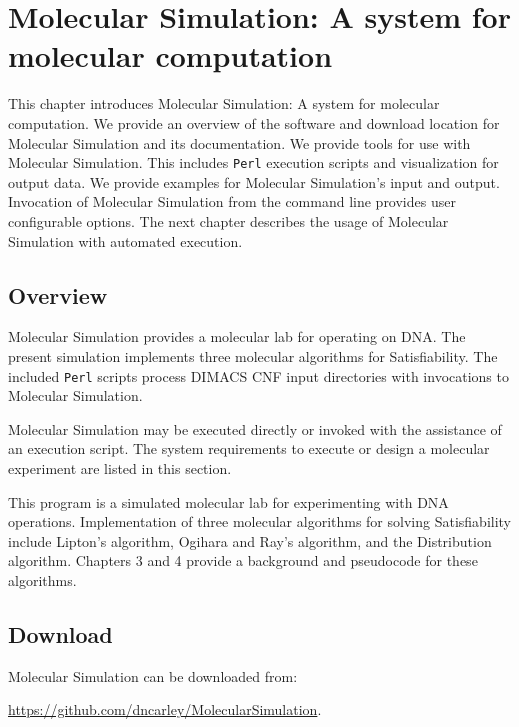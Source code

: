 \chapter{Molecular Simulation: A system for molecular computation}


This chapter introduces Molecular Simulation: A system for molecular computation.  We provide an overview of the software and download location for Molecular Simulation and its documentation. We provide tools for use with Molecular Simulation.  This includes \texttt{Perl} execution scripts and visualization for output data.  We provide examples for Molecular Simulation's input and output.  Invocation of Molecular Simulation from the command line provides user configurable options.  The next chapter describes the usage of Molecular Simulation with automated execution.
	
	\section{Overview}
	

Molecular Simulation provides a molecular lab for operating on DNA.  The present simulation implements three molecular algorithms for {\sc Satisfiability}.  The included \texttt{Perl} scripts process DIMACS CNF input directories with invocations to Molecular Simulation.

Molecular Simulation may be executed directly or invoked with the assistance of an execution script.  The system requirements to execute or design a molecular experiment are listed in this section.  
		
This program is a simulated molecular lab for experimenting with DNA operations. Implementation of three molecular algorithms for solving {\sc Satisfiability} include Lipton's algorithm, Ogihara and Ray's algorithm, and the Distribution algorithm.  Chapters 3 and 4 provide a background and pseudocode for these algorithms.		

	\section{Download}
	\noindent Molecular Simulation can be downloaded from:
	
	\url{https://github.com/dncarley/MolecularSimulation}. 
	
